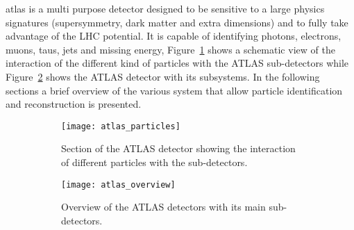 \gls{atlas} is a multi purpose detector designed to be sensitive to a large
physics signatures (supersymmetry, dark matter and extra dimensions) and to
fully take advantage of the LHC potential. It is capable of identifying photons,
electrons, muons, taus, jets and missing energy,
Figure~\ref{fig:atlas_particles} shows a schematic view of the interaction of
the different kind of particles with the ATLAS sub-detectors while
Figure~\ref{fig:atlas_overview} shows the ATLAS detector with its subsystems. In
the following sections a brief overview of the various system that allow
particle identification and reconstruction is presented.

\begin{figure}[!h]
  \centering
  \begin{subfigure}[t]{.48\linewidth}
    \texttt{[image: atlas\_particles]}
    \caption{Section of the ATLAS detector showing the interaction of different
      particles with the sub-detectors.}
    \label{fig:atlas_particles}
  \end{subfigure} \quad
  \begin{subfigure}[t]{.48\linewidth}
    \texttt{[image: atlas\_overview]}
    \caption{Overview of the ATLAS detectors with its main sub-detectors.}
    \label{fig:atlas_overview}
  \end{subfigure}
  \caption{}
  \label{fig:atlas}
\end{figure}
